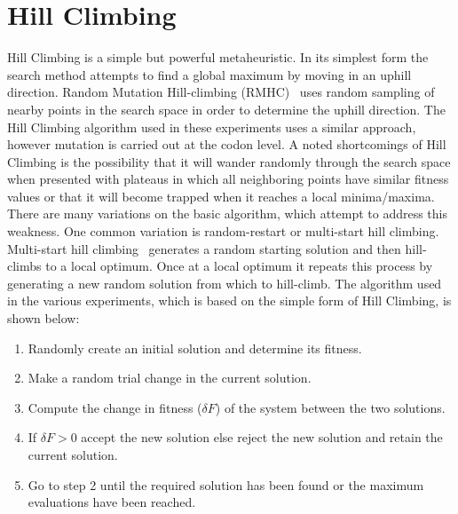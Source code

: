 \section{Hill Climbing}
Hill Climbing is a simple but powerful metaheuristic. In its simplest form the search method attempts to find a global maximum by moving in an uphill direction. Random Mutation Hill-climbing (RMHC)~\cite{mitchell} uses random sampling of nearby points in the search space in order to determine the uphill direction. The Hill Climbing algorithm used in these experiments uses a similar approach, however mutation is carried out at the codon level. A noted shortcomings of Hill Climbing is the possibility that it will wander randomly through the search space when presented with plateaus in which all neighboring points have similar fitness values or that it will become trapped when it reaches a local minima/maxima. There are many variations on the basic algorithm, which attempt to address this weakness. One common variation is random-restart or multi-start hill climbing. Multi-start hill climbing~\cite{duvivier} generates a random starting solution and then hill-climbs to a local optimum. Once at a local optimum it repeats this process by generating a new random solution from which to hill-climb. The algorithm used in the various experiments, which is based on the simple form of Hill Climbing, is shown below:

\begin{center}
\begin{enumerate}
\item Randomly create an initial solution and determine its fitness. 
\item Make a random trial change in the current solution.  
\item Compute the change in fitness ($\delta F$) of the system between the two solutions. 
\item If $\delta F > 0 $ accept the new solution else reject the new solution and retain the current solution.
\item Go to step 2 until  the required solution has been found or the maximum evaluations have been reached. 
\end{enumerate}
\end{center}

